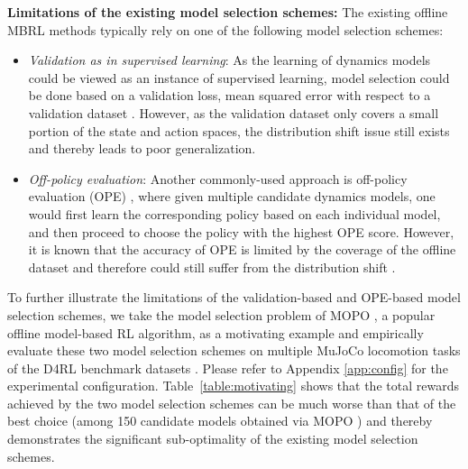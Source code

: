 \noindent\textbf{Limitations of the existing model selection schemes:} The existing offline MBRL methods typically rely on one of the following model selection schemes: 

\vspace{-1mm}
\begin{itemize}[leftmargin=*]
    \item \textit{Validation as in supervised learning}: As the learning of dynamics models could be viewed as an instance of supervised learning, model selection could be done based on a validation loss, \eg mean squared error with respect to a validation dataset \citep{janner2019trust,yu2020mopo}. However, as the validation dataset only covers a small portion of the state and action spaces, the distribution shift issue still exists and thereby leads to poor generalization.
    \vspace{-1mm}
    \item \textit{Off-policy evaluation}: Another commonly-used approach is off-policy evaluation (OPE) \citep{paine2020hyperparameter,voloshin2019empirical}, where given multiple candidate dynamics models, one would first learn the corresponding policy based on each individual model, and then proceed to choose the policy with the highest OPE score. However, it is known that the accuracy of OPE is limited by the coverage of the offline dataset and therefore could still suffer from the distribution shift \citep{tang2021model}. 
\end{itemize}
\vspace{-1mm}
To further illustrate the limitations of the validation-based and OPE-based model selection schemes, we take the model selection problem of MOPO \citep{yu2020mopo}, a popular offline model-based RL algorithm, as a motivating example and empirically evaluate these two model selection schemes on multiple MuJoCo locomotion tasks of the D4RL benchmark datasets \citep{fu2020d4rl}. Please refer to Appendix \ref{app:config} for the experimental configuration. 
Table~\ref{table:motivating} shows that the total rewards achieved by the two model selection schemes can be much worse than that of the best choice (among 150 candidate models obtained via MOPO \citep{yu2020mopo}) and thereby demonstrates the significant sub-optimality of the existing model selection schemes.

